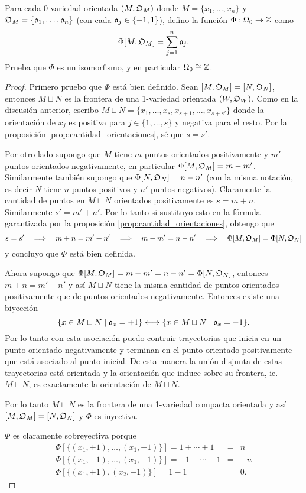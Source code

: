 \begin{ejercicio}\label{ej:43}
  Para cada 0-variedad orientada $(M,\mathfrak{O}_M)$ donde $M=\{x_1,\ldots,x_n\}$ y
  $\mathfrak{O}_M=\{\mathfrak{o}_1,\ldots,\mathfrak{o}_n\}$ (con cada $\mathfrak{o}_j\in\{-1,1\}$), defino la funci\'on $\Phi:\Omega_0\rightarrow\mathbb{Z}$
  como
  \[
    \Phi[M,\mathfrak{O}_M]=\sum_{j=1}^n \mathfrak{o}_j.
  \]
  Prueba que $\Phi$ es un isomorfismo, y en particular $\Omega_0\cong\mathbb{Z}$.
\end{ejercicio}
\begin{proof}%
  Primero pruebo que $\Phi$ est\'a bien definido. Sean $[M,\mathfrak{O}_M]=[N,\mathfrak{O}_N]$, entonces $M\sqcup N$
  es la frontera de una 1-variedad orientada $(W,\mathfrak{O}_W)$. Como en la discusi\'on anterior, escribo
  $M\sqcup N=\{x_1,\ldots,x_s,x_{s+1},\ldots,x_{s+s'}\}$ donde la orientaci\'on de $x_j$ es positiva
  para $j\in\{1,\ldots,s\}$ y negativa para el resto. Por la proposici\'on
  \ref{prop:cantidad_orientaciones}, s\'e que $s=s'$.

  Por otro lado supongo que $M$ tiene $m$ puntos orientados positivamente y $m'$ puntos orientados
  negativamente, en particular $\Phi[M,\mathfrak{O}_M]=m-m'$. Similarmente tambi\'en supongo que
  $\Phi[N,\mathfrak{O}_N]=n-n'$ (con la misma notaci\'on, es decir $N$ tiene $n$ puntos positivos y
  $n'$ puntos negativos). Claramente la cantidad de puntos en $M\sqcup N$ orientados positivamente
  es $s=m+n$. Similarmente $s'=m'+n'$. Por lo tanto si sustituyo esto en la f\'ormula garantizada por
  la proposici\'on \ref{prop:cantidad_orientaciones}, obtengo que
  \[
    s=s' \quad\Longrightarrow\quad
    m+n=m'+n' \quad\Longrightarrow\quad
    m-m'=n-n' \quad\Longrightarrow\quad
    \Phi[M,\mathfrak{O}_M]=\Phi[N,\mathfrak{O}_N]
  \]
  y concluyo que $\Phi$ est\'a bien definida.

  Ahora supongo que $\Phi[M,\mathfrak{O}_M]=m-m'=n-n'=\Phi[N,\mathfrak{O}_N]$, entonces $m+n=m'+n'$ y as\'i
  $M\sqcup N$ tiene la misma cantidad de puntos orientados positivamente que de puntos
  orientados negativamente. Entonces existe una biyecci\'on
  \[
    \{x\in M\sqcup N\mid \mathfrak{o}_x=+1\} \longleftrightarrow \{x\in M\sqcup N\mid \mathfrak{o}_x=-1\}.
  \]
  Por lo tanto con esta asociaci\'on puedo contruir trayectorias que inicia en un punto orientado
  negativamente y terminan en el punto orientado positivamente que est\'a asociado al punto inicial.
  De esta manera la uni\'on disjunta de estas trayectorias est\'a orientada y la orientaci\'on
  que induce sobre su frontera, ie. $M\sqcup N$, es exactamente la orientaci\'on de $M\sqcup N$.

  Por lo tanto $M\sqcup N$ es la frontera de una 1-variedad compacta orientada y as\'i
  $[M,\mathfrak{O}_M]=[N,\mathfrak{O}_N]$ y $\Phi$ es inyectiva.

  $\Phi$ es claramente sobreyectiva porque
  \begin{eqnarray*}
    \Phi[\{(x_1,+1),\ldots,(x_1,+1)\}]=1+\cdots+1&=&n \\
    \Phi[\{(x_1,-1),\ldots,(x_1,-1)\}]=-1-\cdots-1&=&-n \\
    \Phi[\{(x_1,+1),(x_2,-1)\}]=1-1&=&0.
  \end{eqnarray*}
  
  
\end{proof}%

